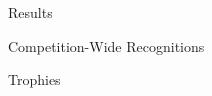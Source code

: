 \documentclass[10pt]{beamer}
\begin{document}
  \begin{frame}{Results}
    \begin{center}
    \end{center}
  \end{frame}

  \begin{frame}{Competition-Wide Recognitions}
    \begin{center}
      {\Huge Trophies}
    \end{center}
  \end{frame}
\end{document}
